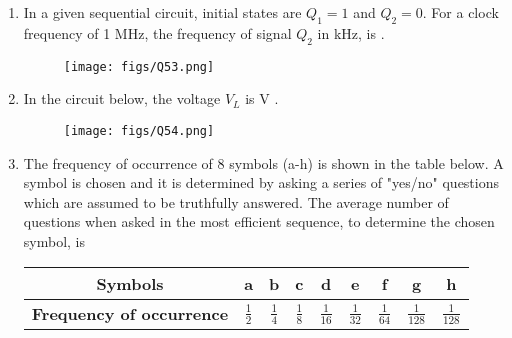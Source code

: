 \documentclass[a4paper, 11pt]{article}
\begin{document}
\begin{enumerate}
    \hfill{}
    
    \item In a given sequential circuit, initial states are $Q_1=1$ and $Q_2=0$. For a clock frequency of 1 MHz, the frequency of signal $Q_2$ in kHz, is \underline{\hspace{2cm}} .
    \begin{figure}[H]
        \centering
        \texttt{[image: figs/Q53.png]}
        \caption*{}
        \label{fig:q63}
    \end{figure}
    
    \hfill{}
    
    \item In the circuit below, the voltage $V_L$ is \underline{\hspace{2cm}} V .
    \begin{figure}[H]
        \centering
        \texttt{[image: figs/Q54.png]}
        \caption*{}
        \label{fig:q64}
    \end{figure}
    
    \hfill{}
    
    \item The frequency of occurrence of 8 symbols (a-h) is shown in the table below. A symbol is chosen and it is determined by asking a series of "yes/no" questions which are assumed to be truthfully answered. The average number of questions when asked in the most efficient sequence, to determine the chosen symbol, is \underline{\hspace{2cm}} 
    \begin{table}[H]
        \centering
        \begin{tabular}{|c|c|c|c|c|c|c|c|c|}
            \hline
            \textbf{Symbols} & a & b & c & d & e & f & g & h \\
            \hline
            \textbf{Frequency of occurrence} & $\frac{1}{2}$ & $\frac{1}{4}$ & $\frac{1}{8}$ & $\frac{1}{16}$ & $\frac{1}{32}$ & $\frac{1}{64}$ & $\frac{1}{128}$ & $\frac{1}{128}$ \\
            \hline
        \end{tabular}
    \end{table}
    \hfill{}

\end{enumerate}
\end{document}
